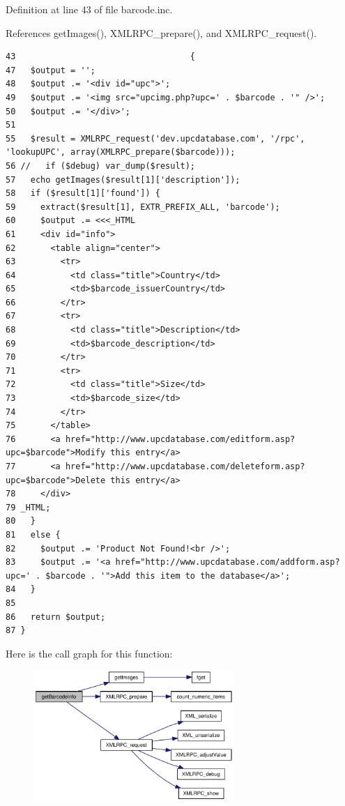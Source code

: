 Definition at line 43 of file barcode.inc.

References getImages(), XMLRPC\_\-prepare(), and XMLRPC\_\-request().

\begin{Code}\begin{verbatim}43                                   {
47   $output = '';
48   $output .= '<div id="upc">';
49   $output .= '<img src="upcimg.php?upc=' . $barcode . '" />';
50   $output .= '</div>';
51 
55   $result = XMLRPC_request('dev.upcdatabase.com', '/rpc', 'lookupUPC', array(XMLRPC_prepare($barcode)));
56 //   if ($debug) var_dump($result);
57   echo getImages($result[1]['description']);
58   if ($result[1]['found']) {
59     extract($result[1], EXTR_PREFIX_ALL, 'barcode');
60     $output .= <<<_HTML
61     <div id="info">
62       <table align="center">
63         <tr>
64           <td class="title">Country</td>
65           <td>$barcode_issuerCountry</td>
66         </tr>
67         <tr>
68           <td class="title">Description</td>
69           <td>$barcode_description</td>
70         </tr>
71         <tr>
72           <td class="title">Size</td>
73           <td>$barcode_size</td>
74         </tr>
75       </table>
76       <a href="http://www.upcdatabase.com/editform.asp?upc=$barcode">Modify this entry</a>
77       <a href="http://www.upcdatabase.com/deleteform.asp?upc=$barcode">Delete this entry</a>
78     </div>
79 _HTML;
80   }
81   else {
82     $output .= 'Product Not Found!<br />';
83     $output .= '<a href="http://www.upcdatabase.com/addform.asp?upc=' . $barcode . '">Add this item to the database</a>';
84   }
85 
86   return $output;
87 }\end{verbatim}
\end{Code}




Here is the call graph for this function:\nopagebreak
\begin{figure}[H]
\begin{center}
\leavevmode
\includegraphics[width=215pt]{barcode_8inc_e10c37e4f9f9b7c6617a388351a27c99_cgraph}
\end{center}
\end{figure}
